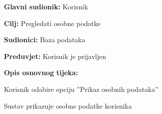 					\noindent {}
					\begin{packed_item}
						
						\item \textbf{Glavni sudionik: }Korisnik
						\item  \textbf{Cilj:} Pregledati osobne podatke
						\item  \textbf{Sudionici:} Baza podataka
						\item  \textbf{Preduvjet:} Korisnik je prijavljen
						\item  \textbf{Opis osnovnog tijeka:}
						
						\item[] \begin{packed_enum}
							
							\item Korisnik odabire opciju ”Prikaz osobnih podataka”
							\item Sustav prikazuje osobne podatke korisnika
						\end{packed_enum}

					\end{packed_item}
					
